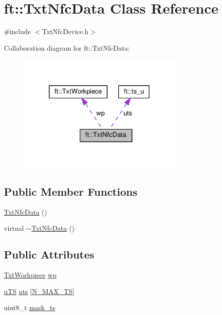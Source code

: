 \hypertarget{classft_1_1_txt_nfc_data}{}\section{ft\+:\+:Txt\+Nfc\+Data Class Reference}
\label{classft_1_1_txt_nfc_data}


{\ttfamily \#include $<$Txt\+Nfc\+Device.\+h$>$}



Collaboration diagram for ft\+:\+:Txt\+Nfc\+Data\+:
\nopagebreak
\begin{figure}[H]
\begin{center}
\leavevmode
\includegraphics[width=234pt]{classft_1_1_txt_nfc_data__coll__graph}
\end{center}
\end{figure}
\subsection*{Public Member Functions}
\begin{DoxyCompactItemize}
\item 
\hyperlink{classft_1_1_txt_nfc_data_a2f52555bf6d581d5ae50ae38dddf51b4}{Txt\+Nfc\+Data} ()
\item 
virtual \hyperlink{classft_1_1_txt_nfc_data_a923f90a26428a0ea6c990545c2923dee}{$\sim$\+Txt\+Nfc\+Data} ()
\end{DoxyCompactItemize}
\subsection*{Public Attributes}
\begin{DoxyCompactItemize}
\item 
\hyperlink{classft_1_1_txt_workpiece}{Txt\+Workpiece} \hyperlink{classft_1_1_txt_nfc_data_aec7e3a438a5ff8f113f5c7819d038c1f}{wp}
\item 
\hyperlink{namespaceft_a6b29d191a4ff3cd5738bcb38e4392811}{u\+TS} \hyperlink{classft_1_1_txt_nfc_data_a7671b20d7d53b5be84267e61abd7ad98}{uts} \mbox{[}\hyperlink{_txt_nfc_device_8h_a4b7859088776a46f4866a6dc71689e6a}{N\+\_\+\+M\+A\+X\+\_\+\+TS}\mbox{]}
\item 
uint8\+\_\+t \hyperlink{classft_1_1_txt_nfc_data_a3ac76c3001f8142057d7784ef5bed85f}{mask\+\_\+ts}
\end{DoxyCompactItemize}



